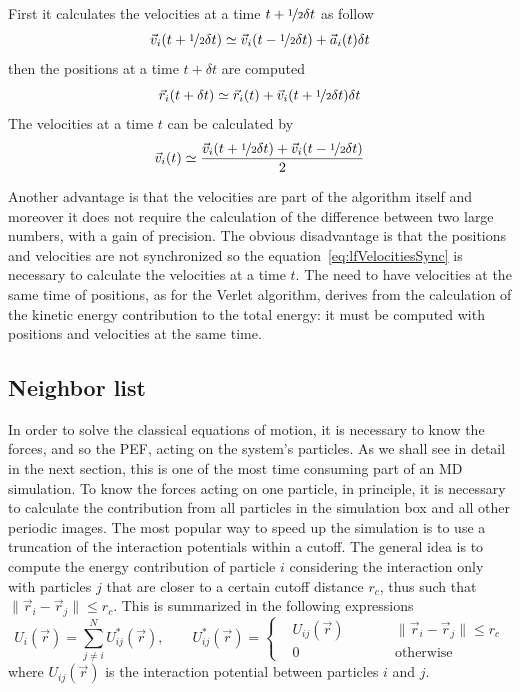 First it calculates the velocities at a time $t+\nicefrac{1}{2}\delta t$ as follow
\begin{equation*}
	\vec v_i(t + \nicefrac{1}{2}\delta t) \simeq \vec v_i(t - \nicefrac{1}{2}\delta t) + \vec a_i(t)\delta t
\end{equation*}
then the positions at a time $t+\delta t$ are computed
\begin{equation*}
	\vec r_i(t + \delta t) \simeq \vec r_i(t) + \vec v_i(t + \nicefrac{1}{2}\delta t)\delta t
\end{equation*}
The velocities at a time $t$ can be calculated by
\begin{equation}
	\vec v_i(t) \simeq \frac{\vec v_i(t + \nicefrac{1}{2}\delta t) + \vec v_i(t - \nicefrac{1}{2}\delta t)}{2}
	\label{eq:lfVelocitiesSync}
\end{equation}

Another advantage is that the velocities are part of the algorithm itself and moreover it does not require the 
calculation of the difference between two large numbers, with a gain of precision. The obvious disadvantage is 
that the positions and velocities are not synchronized so the equation~\eqref{eq:lfVelocitiesSync} is necessary 
to calculate the velocities at a time $t$. The need to have velocities at the same time of positions, as for the 
Verlet algorithm, derives from the calculation of the kinetic energy contribution to the total energy: it must be 
computed with positions and velocities at the same time.

\subsection{Neighbor list}
\label{sec:neighbor}
In order to solve the classical equations of motion, it is necessary to know the forces, and so the \ac{PEF}, 
acting on the system's particles. As we shall see in detail in the next section, this is one of the most time 
consuming part of an \ac{MD} simulation. To know the forces acting on one particle, in principle, it is necessary 
to calculate the contribution from all particles in the simulation box and all other periodic images. The most 
popular way to speed up the simulation is to use a truncation of the interaction potentials within a cutoff. The 
general idea is to compute the energy contribution of particle $i$ considering the interaction only with 
particles $j$ that are closer to a certain cutoff distance $r_c$, thus such that 
$\|\vec r_i - \vec r_j\| \le r_c$. This is summarized in the following expressions
\begin{equation*}
	U_i(\vec r) = \sum_{j\ne i}^N U^*_{ij}(\vec r), \qquad U^*_{ij}(\vec r) = \left \{
	\begin{aligned}
		& U_{ij}(\vec r)& \qquad  &\| \vec r_i - \vec r_j \| \le r_c \\
		& 0			    & \qquad  &\text{otherwise}
	\end{aligned}
	\right .
\end{equation*}
where $U_{ij}(\vec r)$ is the interaction potential between particles $i$ and $j$.

